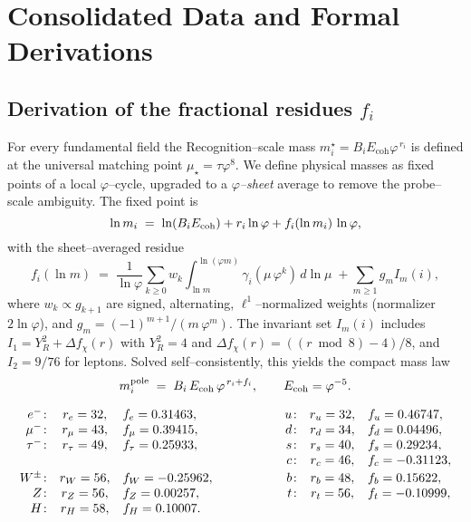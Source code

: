 \section{Consolidated Data and Formal Derivations}

\subsection{Derivation of the fractional residues \texorpdfstring{$f_i$}{f\_i}}
\label{subsec:fi-derivation}

For every fundamental field the Recognition--scale mass
\(m_i^{\star}=B_i E_{\mathrm{coh}}\varphi^{\,r_i}\) is defined at the
 universal matching point \(\mu_\star=\tau\varphi^{8}\).
 We define physical masses as fixed points of a local $\varphi$--cycle,
 upgraded to a \emph{$\varphi$--sheet} average to remove the probe--scale ambiguity. The fixed point is
 \begin{equation}\label{eq:fixed-point-EMR}
   \ln m_i \;=\; \ln(B_iE_{\rm coh}) + r_i\ln\varphi + f_i(\ln m_i)\,\ln\varphi,
 \end{equation}
 with the sheet--averaged residue
 \begin{equation}\label{eq:sheet-avg-EMR}
   f_i(\ln m)\;=\;\frac{1}{\ln\varphi}\sum_{k\ge0} w_k \!\!\int_{\ln m}^{\ln(\varphi m)}\!\!\gamma_i(\mu\,\varphi^k)\, d\ln\mu \;+
   \sum_{m\ge1} g_m I_m(i),
 \end{equation}
 where $w_k\propto g_{k+1}$ are signed, alternating, $\ell^1$--normalized weights (normalizer $2\ln\varphi$), and $g_m={(-1)^{m+1}}/(m\,\varphi^m)$. The invariant set $I_m(i)$ includes $I_1=Y_R^2+\Delta f_\chi(r)$ with $Y_R^2=4$ and $\Delta f_\chi(r)=((r\bmod 8)-4)/8$, and $I_2=9/76$ for leptons. Solved self--consistently, this yields the compact mass law
 \begin{equation}\label{eq:mass-law-EMR}
   m_i^{\text{pole}} \;=\; B_i\,E_{\rm coh}\,\varphi^{\,r_i+f_i},\qquad E_{\rm coh}=\varphi^{-5}.
 \end{equation}

\renewcommand{\arraystretch}{1.15}
\[
\begin{array}{rcl@{\hspace{2cm}}rcl}
e^{-}\!: & r_{e}=32, & f_{e}=0.31463,&
u\!: & r_{u}=32, & f_{u}=0.46747,\\
\mu^{-}\!: & r_{\mu}=43, & f_{\mu}=0.39415,&
d\!: & r_{d}=34, & f_{d}=0.04496,\\
\tau^{-}\!: & r_{\tau}=49, & f_{\tau}=0.25933,&
s\!: & r_{s}=40, & f_{s}=0.29234,\\
&&&
c\!: & r_{c}=46, & f_{c}=-0.31123,\\[2pt]
W^{\pm}\!: & r_{W}=56, & f_{W}=-0.25962,&
b\!: & r_{b}=48, & f_{b}=0.15622,\\
Z\!: & r_{Z}=56, & f_{Z}=0.00257,&
t\!: & r_{t}=56, & f_{t}=-0.10999,\\
H\!: & r_{H}=58, & f_{H}=0.10007.\\
\end{array}
\]

